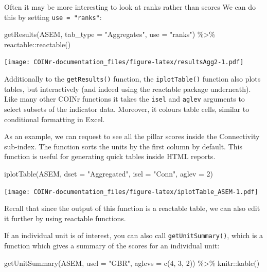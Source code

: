 \documentclass[
]{book}
\newenvironment{Shaded}{\begin{snugshade}}{\end{snugshade}}
\newcommand{\AttributeTok}[1]{\textcolor[rgb]{0.77,0.63,0.00}{#1}}
\newcommand{\DecValTok}[1]{\textcolor[rgb]{0.00,0.00,0.81}{#1}}
\newcommand{\FunctionTok}[1]{\textcolor[rgb]{0.00,0.00,0.00}{#1}}
\newcommand{\NormalTok}[1]{#1}
\newcommand{\SpecialCharTok}[1]{\textcolor[rgb]{0.00,0.00,0.00}{#1}}
\newcommand{\StringTok}[1]{\textcolor[rgb]{0.31,0.60,0.02}{#1}}
\begin{document}
Often it may be more interesting to look at ranks rather than scores We can do this by setting \texttt{use\ =\ "ranks"}:

\begin{Shaded}
\begin{Highlighting}[]
\FunctionTok{getResults}\NormalTok{(ASEM, }\AttributeTok{tab\_type =} \StringTok{"Aggregates"}\NormalTok{, }\AttributeTok{use =} \StringTok{"ranks"}\NormalTok{) }\SpecialCharTok{\%\textgreater{}\%}
\NormalTok{  reactable}\SpecialCharTok{::}\FunctionTok{reactable}\NormalTok{()}
\end{Highlighting}
\end{Shaded}

\texttt{[image: COINr-documentation\_files/figure-latex/resultsAgg2-1.pdf]}

Additionally to the \texttt{getResults()} function, the \texttt{iplotTable()} function also plots tables, but interactively (and indeed using the reactable package underneath). Like many other COINr functions it takes the \texttt{isel} and \texttt{aglev} arguments to select subsets of the indicator data. Moreover, it colours table cells, similar to conditional formatting in Excel.

As an example, we can request to see all the pillar scores inside the Connectivity sub-index. The function sorts the units by the first column by default. This function is useful for generating quick tables inside HTML reports.

\begin{Shaded}
\begin{Highlighting}[]
\FunctionTok{iplotTable}\NormalTok{(ASEM, }\AttributeTok{dset =} \StringTok{"Aggregated"}\NormalTok{, }\AttributeTok{isel =} \StringTok{"Conn"}\NormalTok{, }\AttributeTok{aglev =} \DecValTok{2}\NormalTok{)}
\end{Highlighting}
\end{Shaded}

\texttt{[image: COINr-documentation\_files/figure-latex/iplotTable\_ASEM-1.pdf]}

Recall that since the output of this function is a reactable table, we can also edit it further by using reactable functions.

If an individual unit is of interest, you can also call \texttt{getUnitSummary()}, which is a function which gives a summary of the scores for an individual unit:

\begin{Shaded}
\begin{Highlighting}[]
\FunctionTok{getUnitSummary}\NormalTok{(ASEM, }\AttributeTok{usel =} \StringTok{"GBR"}\NormalTok{, }\AttributeTok{aglevs =} \FunctionTok{c}\NormalTok{(}\DecValTok{4}\NormalTok{, }\DecValTok{3}\NormalTok{, }\DecValTok{2}\NormalTok{)) }\SpecialCharTok{\%\textgreater{}\%}\NormalTok{ knitr}\SpecialCharTok{::}\FunctionTok{kable}\NormalTok{()}
\end{Highlighting}
\end{Shaded}
\end{document}
